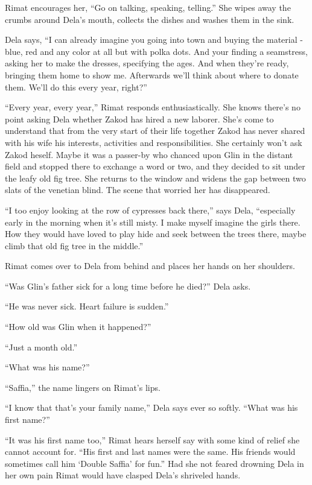\documentclass[twoside,11pt]{book}
\begin{document}
Rimat encourages her, ``Go on talking, speaking, telling.'' She wipes away the crumbs around
Dela's mouth, collects the dishes and washes them in the sink.

Dela says, ``I can already imagine you going into town and buying the material - blue, red and any color at
all but with polka dots. And your finding a seamstress, asking her to make the dresses, specifying the ages. And when
they're ready, bringing them home to show me. Afterwards we'll think about where to donate them. We'll do this every
year, right?''

``Every year, every year,'' Rimat responds enthusiastically. She knows there's no point
asking Dela whether Zakod has hired a new laborer. She's come to understand that from the very start of their life
together Zakod has never shared with his wife his interests, activities and responsibilities. She
certainly won't ask Zakod heself. Maybe it was a passer-by who chanced upon Glin in the distant
field and stopped there to exchange a word or two, and they decided to sit under the leafy old fig
tree.  She returns to the window and widens the gap between two slats of the venetian blind.  The scene that worried
her has disappeared.

``I too enjoy looking at the row of cypresses back there,'' says Dela,
``especially early in the morning when it's still misty. I make myself imagine the girls there. How they
would have loved to play hide and seek between the trees there, maybe climb that old fig tree in the
middle.''

Rimat comes over to Dela from behind and places her hands on her shoulders.

``Was Glin's father sick for a long time before he died?'' Dela asks.

``He was never sick. Heart failure is sudden.''

``How old was Glin when it happened?''

``Just a month old.''

``What was his name?''

``Saffia,'' the name lingers on Rimat's lips.

``I know that that's your family name,'' Dela says ever so softly. ``What was his
first name?''

``It was his first name too,'' Rimat hears herself say with some kind of relief she cannot
account for. ``His first and last names were the same. His friends would sometimes call him `Double
Saffia' for fun.'' Had she not feared drowning Dela in her own pain Rimat would have clasped Dela's
shriveled hands.
\end{document}
